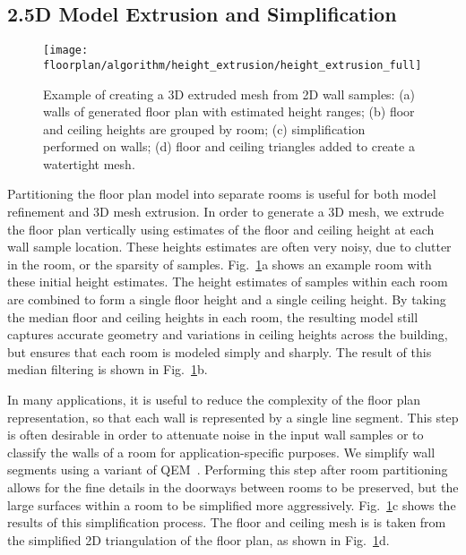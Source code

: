 \documentclass[journal]{IEEEtran}
\begin{document}
\subsection{2.5D Model Extrusion and Simplification}
\label{ssec:extrusion}

\begin{figure}[t]
  \centering
  \texttt{[image: floorplan/algorithm/height\_extrusion/height\_extrusion\_full]}
  \caption{Example of creating a 3D extruded mesh from 2D wall samples:  (a) walls of generated floor plan with estimated height ranges; (b) floor and ceiling heights are grouped by room; (c) simplification performed on walls; (d) floor and ceiling triangles added to create a watertight mesh. }
  \label{fig:heightextrusion}
\end{figure}

Partitioning the floor plan model into separate rooms is useful for both model refinement and 3D mesh extrusion.  In order to generate a 3D mesh, we extrude the floor plan vertically using estimates of the floor and ceiling height at each wall sample location.  These heights estimates are often very noisy, due to clutter in the room, or the sparsity of samples. Fig.~\ref{fig:heightextrusion}a shows an example room with these initial height estimates.  The height estimates of samples within each room are combined to form a single floor height and a single ceiling height.  By taking the median floor and ceiling heights in each room, the resulting model still captures accurate geometry and variations in ceiling heights across the building, but ensures that each room is modeled simply and sharply.  The result of this median filtering is shown in Fig.~\ref{fig:heightextrusion}b.

In many applications, it is useful to reduce the complexity of the floor plan representation, so that each wall is represented by a single line segment.  This step is often desirable in order to attenuate noise in the input wall samples or to classify the walls of a room for application-specific purposes.  We simplify wall segments using a variant of QEM~\cite{QEM,Turner14}. Performing this step after room partitioning allows for the fine details in the doorways between rooms to be preserved, but the large surfaces within a room to be simplified more aggressively.  Fig.~\ref{fig:heightextrusion}c shows the results of this simplification process.  The floor and ceiling mesh is is taken from the simplified 2D triangulation of the floor plan, as shown in Fig.~\ref{fig:heightextrusion}d.
\end{document}
